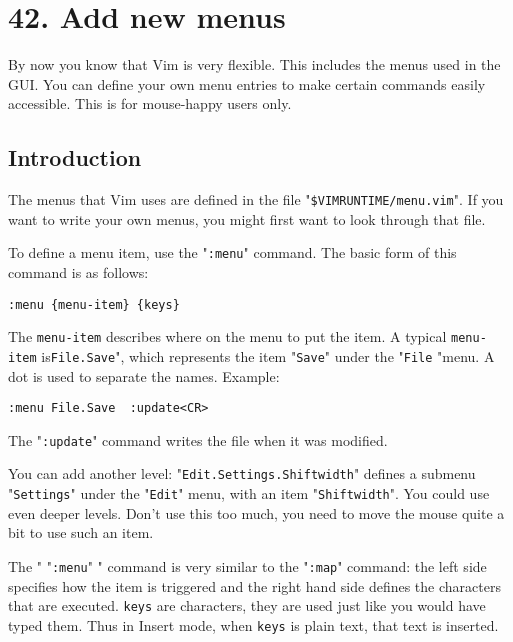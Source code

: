\section{42. Add new menus}
By now you know that Vim is very flexible.
This includes the menus used in the GUI.
You can define your own menu entries to make certain commands easily accessible.
This is for mouse-happy users only.
\localtableofcontents
\subsection{Introduction}
The menus that Vim uses are defined in the file "\texttt{\$VIMRUNTIME/menu.vim}".
If you want to write your own menus, you might first want to look through that file.

To define a menu item, use the "\texttt{:menu}" command.
The basic form of this command is as follows:

\begin{Verbatim}[samepage=true]
 :menu {menu-item} {keys}
\end{Verbatim}

The \texttt{{menu-item}} describes where on the menu to put the item.
A typical \texttt{{menu-item}} is\texttt{File.Save}", which represents the item "\texttt{Save}" under the "\texttt{File} "menu.
A dot is used to separate the names.
Example:

\begin{Verbatim}[samepage=true]
 :menu File.Save  :update<CR>
\end{Verbatim}

The "\texttt{:update}" command writes the file when it was modified.

You can add another level: "\texttt{Edit.Settings.Shiftwidth}" defines a submenu "\texttt{Settings}" under the "\texttt{Edit}" menu, with an item "\texttt{Shiftwidth}".
You could use even deeper levels.
Don't use this too much, you need to move the mouse quite a bit to use such an item.

The " "\texttt{:menu}" " command is very similar to the "\texttt{:map}" command: the left side specifies how the item is triggered and the right hand side defines the characters that are executed.
\texttt{{keys}} are characters, they are used just like you would have typed them.
Thus in Insert mode, when \texttt{{keys}} is plain text, that text is inserted.

